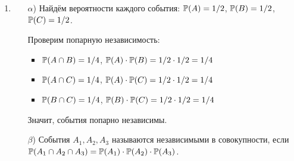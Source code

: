 \begin{enumerate}
\item
\begin{enumerate}
\item[$\alpha$)] Найдём вероятности каждого события: $\P(A) = 1/2$, $\P(B) = 1/2$, $\P(C) = 1/2$.

Проверим попарную независимость:
\begin{itemize}
\item $\P(A \cap B) = 1/4$, $\P(A) \cdot \P(B) = 1/2 \cdot 1/2 = 1/4$
\item $\P(A \cap C) = 1/4$, $\P(A) \cdot \P(C) = 1/2 \cdot 1/2 = 1/4$
\item $\P(B \cap C) = 1/4$, $\P(B) \cdot \P(C) = 1/2 \cdot 1/2 = 1/4$
\end{itemize}
Значит, события попарно независимы.
\item[$\beta$)] События $A_1, A_2, A_3$ называются независимыми в совокупности, если $\P(A_1 \cap A_2 \cap A_3) = \P(A_1) \cdot \P(A_2) \cdot \P(A_3)$.


\end{enumerate}
\end{enumerate}
